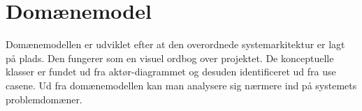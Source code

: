 \section{Domænemodel}
\label{sec:Domainmodel}

Domænemodellen er udviklet efter at den overordnede systemarkitektur er lagt på plads. Den fungerer som en visuel ordbog over projektet. De konceptuelle klasser er fundet ud fra aktør-diagrammet og desuden identificeret ud fra use casene. Ud fra domænemodellen kan man analysere sig nærmere ind på systemets problemdomæner.

